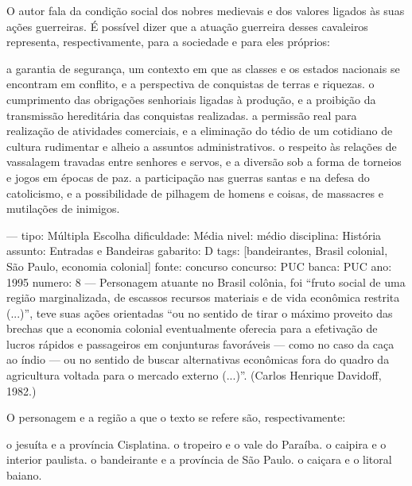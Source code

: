 O autor fala da condição social dos nobres medievais e dos valores ligados às suas ações guerreiras. É possível dizer que a atuação guerreira desses cavaleiros representa, respectivamente, para a sociedade e para eles próprios:
\begin{choices}
\choice a garantia de segurança, um contexto em que as classes e os estados nacionais se encontram em conflito, e a perspectiva de conquistas de terras e riquezas.
\choice o cumprimento das obrigações senhoriais ligadas à produção, e a proibição da transmissão hereditária das conquistas realizadas.
\choice a permissão real para realização de atividades comerciais, e a eliminação do tédio de um cotidiano de cultura rudimentar e alheio a assuntos administrativos.
\choice o respeito às relações de vassalagem travadas entre senhores e servos, e a diversão sob a forma de torneios e jogos em épocas de paz.
\CorrectChoice a participação nas guerras santas e na defesa do catolicismo, e a possibilidade de pilhagem de homens e coisas, de massacres e mutilações de inimigos.
\end{choices}

---
tipo: Múltipla Escolha
dificuldade: Média
nivel: médio
disciplina: História
assunto: Entradas e Bandeiras
gabarito: D
tags: [bandeirantes, Brasil colonial, São Paulo, economia colonial]
fonte: concurso
concurso: PUC
banca: PUC
ano: 1995
numero: 8
---
\question
Personagem atuante no Brasil colônia, foi ``fruto social de uma região marginalizada, de escassos recursos materiais e de vida econômica restrita (...)'', teve suas ações orientadas ``ou no sentido de tirar o máximo proveito das brechas que a economia colonial eventualmente oferecia para a efetivação de lucros rápidos e passageiros em conjunturas favoráveis --- como no caso da caça ao índio --- ou no sentido de buscar alternativas econômicas fora do quadro da agricultura voltada para o mercado externo (...)''. (Carlos Henrique Davidoff, 1982.)

O personagem e a região a que o texto se refere são, respectivamente:
\begin{choices}
\choice o jesuíta e a província Cisplatina.
\choice o tropeiro e o vale do Paraíba.
\choice o caipira e o interior paulista.
\CorrectChoice o bandeirante e a província de São Paulo.
\choice o caiçara e o litoral baiano.
\end{choices}

